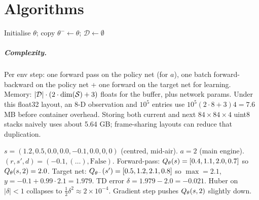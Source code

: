 \documentclass[11pt,oneside]{scrbook}
\begin{document}
\chapter{Algorithms}

\begin{algorithm}[H]
\caption{DQN (Mnih et al., 2015)}
Initialise $\theta$; copy $\theta^- \leftarrow \theta$; $\mathcal{D} \leftarrow \emptyset$\;
\end{algorithm}

\paragraph{Complexity.} Per env step: one forward pass on the policy net (for $a$), one
batch forward-backward on the policy net + one forward on the target net for learning.
Memory: $|\mathcal D| \cdot (2 \cdot \dim(\mathcal{S}) + 3)$ floats for the buffer, plus
network params. Under this float32 layout, an 8-D observation and $10^5$ entries use
$10^5(2\cdot8+3)4=7.6$ MB before container overhead. Storing both
current and next $84\times84\times4$ uint8 stacks naively uses about
5.64 GB; frame-sharing layouts can reduce that duplication.

\begin{example}
$s = (1.2, 0.5, 0.0, 0.0, -0.1, 0.0, 0, 0)$ (centred, mid-air). $a = 2$ (main engine).
$(r, s', d) = (-0.1, (\ldots), \text{False})$. Forward-pass: $Q_\theta(s) = [0.4, 1.1,
2.0, 0.7]$ so $Q_\theta(s, 2) = 2.0$. Target net: $Q_{\theta^-}(s') = [0.5, 1.2, 2.1,
0.8]$ so $\max = 2.1$, $y = -0.1 + 0.99 \cdot 2.1 = 1.979$. TD error $\delta = 1.979 - 2.0
= -0.021$. Huber on $|\delta| < 1$ collapses to $\tfrac{1}{2}\delta^2 \approx 2 \times
10^{-4}$. Gradient step pushes $Q_\theta(s, 2)$ slightly down.
\end{example}
\end{document}
